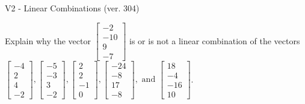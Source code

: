 \begin{exercise}
  \begin{exerciseTitle}V2 - Linear Combinations (ver. 304)\end{exerciseTitle}
  \begin{exerciseStatement}
    Explain why the vector \(\left[\begin{array}{c}
-2 \\
-10 \\
9 \\
-7
\end{array}\right]\)  is or is not a linear 
	combination of the vectors \(\left[\begin{array}{c}
-4 \\
2 \\
4 \\
-2
\end{array}\right] , \left[\begin{array}{c}
-5 \\
-3 \\
3 \\
-2
\end{array}\right] , \left[\begin{array}{c}
2 \\
2 \\
-1 \\
0
\end{array}\right] , \left[\begin{array}{c}
-24 \\
-8 \\
17 \\
-8
\end{array}\right] , \text{ and } \left[\begin{array}{c}
18 \\
-4 \\
-16 \\
10
\end{array}\right]\).
	



\end{exerciseStatement}
\end{exercise}
